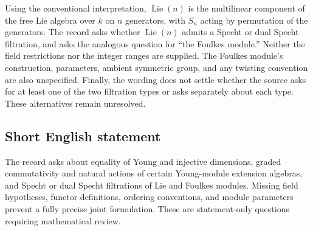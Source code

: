 \documentclass[11pt]{article}
\begin{document}
\begin{enumerate}
Using the conventional interpretation, \(\operatorname{Lie}(n)\) is the multilinear component of the free Lie algebra over \(k\) on \(n\) generators, with \(S_n\) acting by permutation of the generators. The record asks whether \(\operatorname{Lie}(n)\) admits a Specht or dual Specht filtration, and asks the analogous question for ``the Foulkes module.'' Neither the field restrictions nor the integer ranges are supplied. The Foulkes module's construction, parameters, ambient symmetric group, and any twisting convention are also unspecified. Finally, the wording does not settle whether the source asks for at least one of the two filtration types or asks separately about each type. These alternatives remain unresolved.
\end{enumerate}
\subsection{Short English statement}
The record asks about equality of Young and injective dimensions, graded commutativity and natural actions of certain Young-module extension algebras, and Specht or dual Specht filtrations of Lie and Foulkes modules. Missing field hypotheses, functor definitions, ordering conventions, and module parameters prevent a fully precise joint formulation. These are statement-only questions requiring mathematical review.
\end{document}
